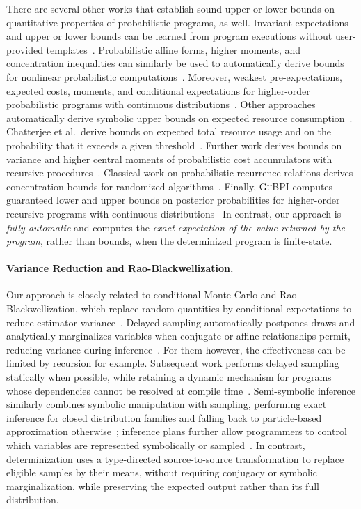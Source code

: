 There are several other works that establish sound upper or lower bounds on quantitative properties of probabilistic programs, as well. Invariant expectations and upper or lower bounds can be learned from program executions without user-provided templates~\cite{bao2022data}. Probabilistic affine forms, higher moments, and concentration inequalities can similarly be used to automatically derive bounds for nonlinear probabilistic computations~\cite{bouissou2016}. Moreover, weakest pre-expectations, expected costs, moments, and conditional expectations for higher-order probabilistic programs with continuous distributions~\cite{kura2024automated}. Other approaches automatically derive symbolic upper bounds on expected resource consumption~\cite{ngo2018bounded}. Chatterjee et al.\ derive bounds on expected total resource usage and on the probability that it exceeds a given threshold~\cite{chatterjee2024quantitative}. Further work derives bounds on variance and higher central moments of probabilistic cost accumulators with recursive procedures~\cite{wang2021central}. Classical work on probabilistic recurrence relations derives concentration bounds for randomized algorithms~\cite{karp1994}. Finally, \textsc{GuBPI} computes guaranteed lower and upper bounds on posterior probabilities for higher-order recursive programs with continuous distributions~\cite{beutner2022guaranteed} In contrast, our approach is \emph{fully automatic} and computes the \emph{exact expectation of the value returned by the program}, rather than bounds, when the determinized program is finite-state.

\paragraph{Variance Reduction and Rao-Blackwellization.}
Our approach is closely related to conditional Monte Carlo and Rao--Blackwellization, which replace random quantities by conditional expectations to reduce estimator variance~\cite{owen2013montecarlo,casella1996rao}. Delayed sampling automatically postpones draws and analytically marginalizes variables when conjugate or affine relationships permit, reducing variance during inference~\cite{murray2018delayed}. For them however, the effectiveness can be limited by recursion for example. Subsequent work performs delayed sampling statically when possible, while retaining a dynamic mechanism for programs whose dependencies cannot be resolved at compile time~\cite{caylak2024delayed}. Semi-symbolic inference similarly combines symbolic manipulation with sampling, performing exact inference for closed distribution families and falling back to particle-based approximation otherwise~\cite{atkinson2022semisymbolic}; inference plans further allow programmers to control which variables are represented symbolically or sampled~\cite{cheng2025plans}. In contrast, determinization uses a type-directed source-to-source transformation to replace eligible samples by their means, without requiring conjugacy or symbolic marginalization, while preserving the expected output rather than its full distribution.

